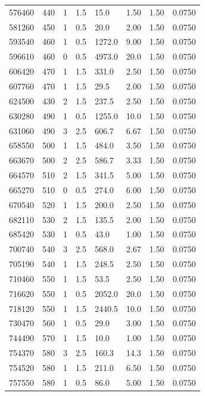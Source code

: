 \documentclass[preview]{standalone}
\begin{document}
{{{\begin{tabular}{L{1.2cm}C{1.2cm} C{0.3cm}C{0.5cm} C{1.4cm}C{1.4cm} C{1.4cm}C{1.4cm}}
  576460  &   440  & 1     & 1.5 &  15.0  & 1.50  & 1.50 &  0.0750   \\ 
  581260  &   450  & 1     & 0.5 &  20.0  & 2.00  & 1.50 &  0.0750   \\ 
  593540  &   460  & 1     & 0.5 &  1272.0  & 9.00  & 1.50 &  0.0750   \\ 
  596610  &   460  & 0     & 0.5 &  4973.0  & 20.0  & 1.50 &  0.0750   \\ 
  606420  &   470  & 1     & 1.5 &  331.0  & 2.50  & 1.50 &  0.0750   \\ 
  607760  &   470  & 1     & 1.5 &  29.5  & 2.00  & 1.50 &  0.0750   \\ 
  624500  &   430  & 2     & 1.5 &  237.5  & 2.50  & 1.50 &  0.0750   \\ 
  630280  &   490  & 1     & 0.5 &  1255.0  & 10.0  & 1.50 &  0.0750   \\ 
  631060  &   490  & 3     & 2.5 &  606.7  & 6.67  & 1.50 &  0.0750   \\ 
  658550  &   500  & 1     & 1.5 &  484.0  & 3.50  & 1.50 &  0.0750   \\ 
  663670  &   500  & 2     & 2.5 &  586.7  & 3.33  & 1.50 &  0.0750   \\ 
  664570  &   510  & 2     & 1.5 &  341.5  & 5.00  & 1.50 &  0.0750   \\ 
  665270  &   510  & 0     & 0.5 &  274.0  & 6.00  & 1.50 &  0.0750   \\ 
  670540  &   520  & 1     & 1.5 &  200.0  & 2.50  & 1.50 &  0.0750   \\ 
  682110  &   530  & 2     & 1.5 &  135.5  & 2.00  & 1.50 &  0.0750   \\ 
  685420  &   530  & 1     & 0.5 &  43.0  & 1.00  & 1.50 &  0.0750   \\ 
  700740  &   540  & 3     & 2.5 &  568.0  & 2.67  & 1.50 &  0.0750   \\ 
  705190  &   540  & 1     & 1.5 &  248.5  & 2.50  & 1.50 &  0.0750   \\ 
  710460  &   550  & 1     & 1.5 &  53.5  & 2.50  & 1.50 &  0.0750   \\ 
  716620  &   550  & 1     & 0.5 &  2052.0  & 20.0  & 1.50 &  0.0750   \\ 
  718120  &   550  & 1     & 1.5 &  2440.5  & 10.0  & 1.50 &  0.0750   \\ 
  730470  &   560  & 1     & 0.5 &  29.0  & 3.00  & 1.50 &  0.0750   \\ 
  744490  &   570  & 1     & 1.5 &  10.0  & 1.00  & 1.50 &  0.0750   \\ 
  754370  &   580  & 3     & 2.5 &  160.3  & 14.3  & 1.50 &  0.0750   \\ 
  754520  &   580  & 1     & 1.5 &  211.0  & 6.50  & 1.50 &  0.0750   \\ 
  757550  &   580  & 1     & 0.5 &  86.0  & 5.00  & 1.50 &  0.0750   \\ 
\hline 
\end{tabular} 

}}}
\end{document}
